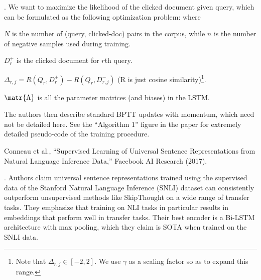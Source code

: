 \documentclass[11pt]{article}
\begin{document}
\myspace
\p {}. We want to maximize the likelihood of the clicked document given query, which can be formulated as the following optimization problem:
where 
\begin{compactitem}
	\item $N$ is the number of (query, clicked-doc) pairs in the corpus, while $n$ is the number of negative samples used during training.
	\item $D_r^+$ is the clicked document for $r$th query.
	\item $\Delta_{r,j} = R(Q_r, D_r^+) - R(Q_r, D_{r,j}^-)$ (R is just cosine similarity)\footnote{
		Note that $\Delta_{r,j} \in [-2, 2]$. We use $\gamma$ as a scaling factor so as to expand this range.
	}.
	\item $\matr{\Lambda}$ is all the parameter matrices (and biases) in the LSTM. 
\end{compactitem}
The authors then describe standard BPTT updates with momentum, which need not be detailed here. See the ``Algorithm 1'' figure in the paper for extremely detailed pseudo-code of the training procedure.





\vspace{-1em}
{\footnotesize Conneau et al., ``Supervised Learning of Universal Sentence Representations from Natural Language Inference Data,'' Facebook AI Research (2017).}

\p {}. Authors claim universal sentence representations trained using the supervised data of the Stanford Natural Language Inference (SNLI) dataset can consistently outperform unsupervised methods like SkipThought on a wide range of transfer tasks. They emphasize that training on NLI tasks in particular results in embeddings that perform well in transfer tasks. Their best encoder is a Bi-LSTM architecture with max pooling, which they claim is SOTA when trained on the SNLI data.
\end{document}
